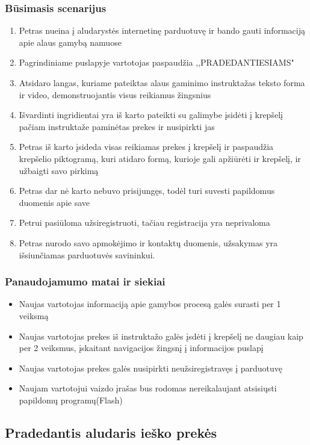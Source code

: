 \documentclass[oneside]{VUMIFPSkursinis}
\begin{document}
		\subsubsection{Būsimasis scenarijus}
			\begin{enumerate}
				\item{Petras nueina į aludarystės internetinę parduotuvę ir bando gauti informaciją apie alaus gamybą namuose}
				\item{Pagrindiniame puslapyje vartotojas paspaudžia ,,PRADEDANTIESIAMS"}
				\item{Atsidaro langas, kuriame pateiktas alaus gaminimo instruktažas teksto forma ir video, demonstruojantis visus reikiamus žingsnius}
				\item{Išvardinti ingridientai yra iš karto pateikti su galimybe įsidėti į krepšelį pačiam instruktaže paminėtas prekes ir nusipirkti jas}
				\item{Petras iš karto įsideda visas reikiamas prekes į krepšelį ir paspaudžia krepšelio piktogramą, kuri atidaro formą, kurioje gali apžiūrėti ir krepšelį, ir užbaigti savo pirkimą}
				\item{Petras dar nė karto nebuvo prisijungęs, todėl turi suvesti papildomus duomenis apie save}
				\item{Petrui pasiūloma užsiregistruoti, tačiau registracija yra neprivaloma}
				\item{Petras nurodo savo apmokėjimo ir kontaktų duomenis, užsakymas yra išsiunčiamas parduotuvės savininkui.}
			\end{enumerate}
		\subsubsection{Panaudojamumo matai ir siekiai}
			\begin{itemize}
				\item{Naujas vartotojas informaciją apie gamybos procesą galės surasti per 1 veiksmą}
				\item{Naujas vartotojas prekes iš instruktažo galės įsdėti į krepšelį ne daugiau kaip per 2 veiksmus, įskaitant navigacijos žingsnį į informacijos puslapį}
				\item{Naujas vartotojas prekes galės nusipirkti neužsiregistravęs į parduotuvę}
				\item{Naujam vartotojui vaizdo įrašas bus rodomas nereikalaujant atsisiųsti papildomų programų(Flash)}
			\end{itemize}

	\subsection{Pradedantis aludaris ieško prekės}
\end{document}
